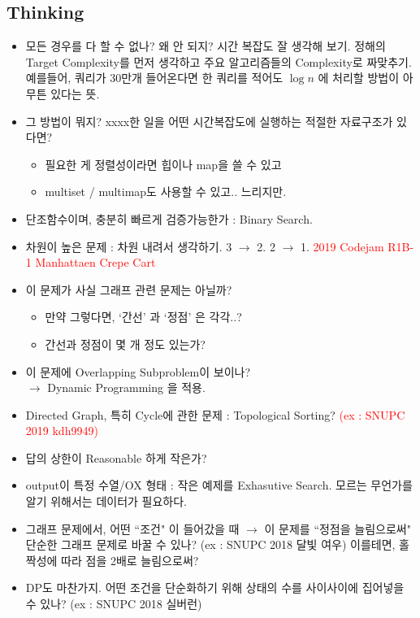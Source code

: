 \documentclass[9pt, a4paper, notitlepage]{extreport}
\begin{document}
\begin{multicols*}{2}
	\section{Thinking}
	\begin{itemize}
		\item 모든 경우를 다 할 수 없나? 왜 안 되지? 시간 복잡도 잘 생각해 보기. 정해의 Target Complexity를 먼저 생각하고 주요 알고리즘들의 Complexity로 짜맞추기.\\
		예를들어, 쿼리가 30만개 들어온다면 한 쿼리를 적어도 $\log{n}$ 에 처리할 방법이 아무튼 있다는 뜻.
		\item 그 방법이 뭐지? xxxx한 일을 어떤 시간복잡도에 실행하는 적절한 자료구조가 있다면?
		\begin{itemize}
			\item 필요한 게 정렬성이라면 힙이나 map을 쓸 수 있고
			\item multiset / multimap도 사용할 수 있고.. 느리지만.
		\end{itemize}
		\item 단조함수이며, 충분히 빠르게 검증가능한가 : Binary Search.
		\item 차원이 높은 문제 : 차원 내려서 생각하기. 3 $\rightarrow$ 2. 2 $\rightarrow$ 1. \textcolor{red}{2019 Codejam R1B-1 Manhattaen Crepe Cart}
		\item 이 문제가 사실 그래프 관련 문제는 아닐까?
			\begin{itemize}
				\item 만약 그렇다면, `간선' 과 `정점' 은 각각..?
				\item 간선과 정점이 몇 개 정도 있는가?
			\end{itemize}
		\item 이 문제에 Overlapping Subproblem이 보이나? \\$\rightarrow$ Dynamic Programming 을 적용.
		\item Directed Graph, 특히 Cycle에 관한 문제 : Topological Sorting? \textcolor{red}{(ex : SNUPC 2019 kdh9949)}
		\item 답의 상한이 Reasonable 하게 작은가?
		\item output이 특정 수열/OX 형태 : 작은 예제를 Exhasutive Search. 모르는 무언가를 알기 위해서는 데이터가 필요하다.
		\item 그래프 문제에서, 어떤 ``조건" 이 들어갔을 때 $\to$ 이 문제를 ``정점을 늘림으로써" 단순한 그래프 문제로 바꿀 수 있나? (ex : SNUPC 2018 달빛 여우) 이를테면, 홀짝성에 따라 점을 2배로 늘림으로써?
		\item DP도 마찬가지. 어떤 조건을 단순화하기 위해 상태의 수를 사이사이에 집어넣을 수 있나? (ex : SNUPC 2018 실버런)

\end{itemize}
\end{multicols*}
\end{document}
